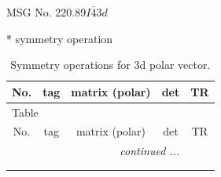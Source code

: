 \documentclass[fleqn,8pt]{jsarticle}
\begin{document}
\setcounter{MaxMatrixCols}{32}

\renewcommand{\tablename}{Table~}
\renewcommand{\figurename}{Figure~}
\begin{center}
\LARGE
MSG No. 220.89\quad$I\bar{4}3d$
\end{center}
* symmetry operation
\renewcommand{\arraystretch}{1.3}
\begin{longtable}{ccccc}
\caption{Symmetry operations for 3d polar vector.}
 \\
 \hline \hline
No. & tag & matrix (polar) & det & TR \\ \hline \endfirsthead

\multicolumn{4}{l}{\tablename\ \thetable{}} \\
 \hline \hline
No. & tag & matrix (polar) & det & TR \\ \hline \endhead

 \hline \hline
\multicolumn{4}{r}{\footnotesize\it continued ...} \\ \endfoot

 \hline \hline
\multicolumn{4}{r}{} \\ \endlastfoot


\end{longtable}
\end{document}
